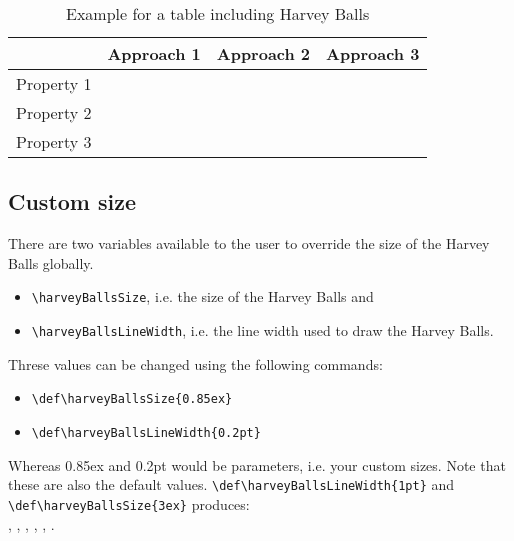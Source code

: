 \documentclass{article}%
\begin{document}
\begin{table}[h]
	\centering
		\begin{tabular}{lccc}
\hline
									& Approach 1 & Approach 2 & Approach 3\\
\hline
			Property 1	& \harveyBallNone & \harveyBallQuarter & \harveyBallHalf \\
			Property 2	& \harveyBallHalf & \harveyBallThreeQuarter & \harveyBallFull \\
			Property 3	& \harveyBallFull & \harveyBallThreeQuarter & \harveyBallQuarter\\
\hline			
		\end{tabular}
	\caption{Example for a table including Harvey Balls}
	\label{tab:ExampleForATableIncludingHarveyBalls}
\end{table}

\subsection{Custom size}

There are two variables available to the user to override the size of the Harvey Balls globally.
\begin{itemize}
\item \verb|\harveyBallsSize|, i.e. the size of the Harvey Balls and
\item \verb|\harveyBallsLineWidth|, i.e. the line width used to draw the Harvey Balls.
\end{itemize}
Threse values can be changed using the following commands:
\begin{itemize}
\item \verb|\def\harveyBallsSize{0.85ex}|
\item \verb|\def\harveyBallsLineWidth{0.2pt}|
\end{itemize}
Whereas 0.85ex and 0.2pt would be parameters, i.e. your custom sizes. Note that these are also the default values.
\verb|\def\harveyBallsLineWidth{1pt}| and \verb|\def\harveyBallsSize{3ex}| produces:\\
\def\harveyBallsLineWidth{1pt}\def\harveyBallsSize{3ex}
\harveyBallNone, \harveyBallNone, \harveyBallQuarter,  \harveyBallHalf, \harveyBallThreeQuarter, \harveyBallFull. \\ 

\end{document}

